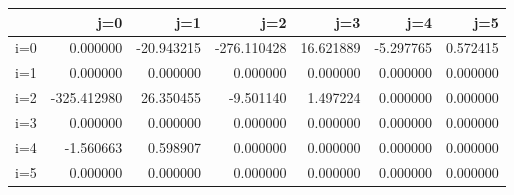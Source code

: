 \begin{tabular}{lrrrrrr}
\toprule
{} &         j=0 &        j=1 &         j=2 &        j=3 &       j=4 &       j=5 \\
\midrule
i=0 &    0.000000 & -20.943215 & -276.110428 &  16.621889 & -5.297765 &  0.572415 \\
i=1 &    0.000000 &   0.000000 &    0.000000 &   0.000000 &  0.000000 &  0.000000 \\
i=2 & -325.412980 &  26.350455 &   -9.501140 &   1.497224 &  0.000000 &  0.000000 \\
i=3 &    0.000000 &   0.000000 &    0.000000 &   0.000000 &  0.000000 &  0.000000 \\
i=4 &   -1.560663 &   0.598907 &    0.000000 &   0.000000 &  0.000000 &  0.000000 \\
i=5 &    0.000000 &   0.000000 &    0.000000 &   0.000000 &  0.000000 &  0.000000 \\
\bottomrule
\end{tabular}
